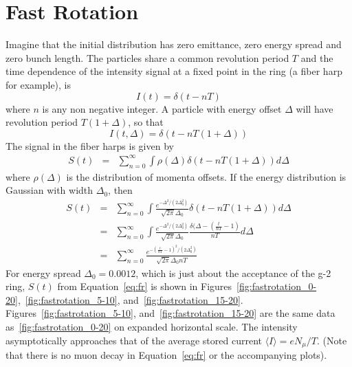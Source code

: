 \documentclass[10pt]{article}
\begin{document}
\section{Fast Rotation}
Imagine that the initial distribution has zero emittance, zero energy spread and zero bunch length.
The particles share a common revolution period $T$ and the time dependence of the intensity signal
at a fixed point in the ring (a fiber harp for example), is $$I(t) = \delta(t-nT)$$
where $n$ is any non negative integer. A particle with energy offset $\Delta$ will have revolution period $T(1+\Delta)$, so that
$$I(t,\Delta) = \delta(t-nT(1+\Delta))$$
The signal in the fiber harps is given by
\begin{eqnarray*}
S(t) &=& \sum_{n=0}^\infty \int \rho(\Delta) \delta(t-nT(1+\Delta)) d\Delta
\end{eqnarray*}
where $\rho(\Delta)$ is the distribution of momenta offsets. If the energy distribution is Gaussian with width $\Delta_0$, then
\begin{eqnarray}
S(t)&=& \sum_{n=0}^\infty \int \frac{e^{-\Delta^2/(2\Delta_0^2)}}{\sqrt{2\pi}\Delta_0} \delta(t-nT(1+\Delta)) d\Delta\nonumber\\
&=& \sum_{n=0}^\infty \int \frac{e^{-\Delta^2/(2\Delta_0^2)}}{\sqrt{2\pi}\Delta_0} \frac{\delta(\Delta-(\frac{t}{nT}-1)}{nT} d\Delta\nonumber\\
&=& \sum_{n=0}^\infty\frac{e^{-(\frac{t}{nT}-1)^2/(2\Delta_0^2)}}{\sqrt{2\pi}\Delta_0 nT}\label{eq:fr}
\end{eqnarray}
For energy spread $\Delta_0= 0.0012$, which is just about the acceptance of the g-2 ring, $S(t)$ from Equation~\ref{eq:fr} is shown
in Figures~\ref{fig:fastrotation_0-20},~\ref{fig:fastrotation_5-10}, and~\ref{fig:fastrotation_15-20}. 
Figures~\ref{fig:fastrotation_5-10}, and~\ref{fig:fastrotation_15-20} are the same data as~\ref{fig:fastrotation_0-20} on expanded horizontal scale.
The intensity asymptotically approaches that of the average stored current $\langle I\rangle = eN_\mu /T$.
(Note that there is no muon decay in Equation~\ref{eq:fr} or the accompanying plots).
\end{document}
